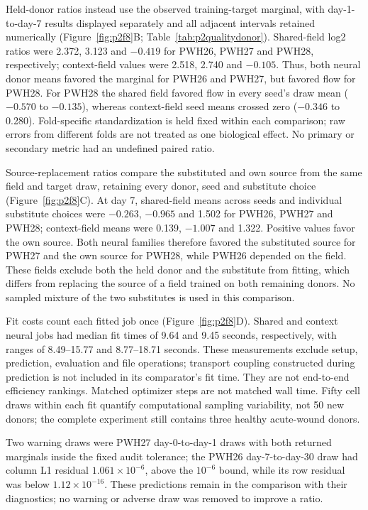 \documentclass[10pt,a4paper]{article}
\begin{document}
Held-donor ratios instead use the observed training-target marginal, with day-1-to-day-7 results displayed separately and all adjacent intervals retained numerically (Figure~\ref{fig:p2f8}B; Table~\ref{tab:p2qualitydonor}). Shared-field log2 ratios were 2.372, 3.123 and $-0.419$ for PWH26, PWH27 and PWH28, respectively; context-field values were 2.518, 2.740 and $-0.105$. Thus, both neural donor means favored the marginal for PWH26 and PWH27, but favored flow for PWH28. For PWH28 the shared field favored flow in every seed's draw mean ($-0.570$ to $-0.135$), whereas context-field seed means crossed zero ($-0.346$ to 0.280). Fold-specific standardization is held fixed within each comparison; raw errors from different folds are not treated as one biological effect. No primary or secondary metric had an undefined paired ratio.




Source-replacement ratios compare the substituted and own source from the same field and target draw, retaining every donor, seed and substitute choice (Figure~\ref{fig:p2f8}C). At day 7, shared-field means across seeds and individual substitute choices were $-0.263$, $-0.965$ and 1.502 for PWH26, PWH27 and PWH28; context-field means were 0.139, $-1.007$ and 1.322. Positive values favor the own source. Both neural families therefore favored the substituted source for PWH27 and the own source for PWH28, while PWH26 depended on the field. These fields exclude both the held donor and the substitute from fitting, which differs from replacing the source of a field trained on both remaining donors. No sampled mixture of the two substitutes is used in this comparison.

Fit costs count each fitted job once (Figure~\ref{fig:p2f8}D). Shared and context neural jobs had median fit times of 9.64 and 9.45 seconds, respectively, with ranges of 8.49--15.77 and 8.77--18.71 seconds. These measurements exclude setup, prediction, evaluation and file operations; transport coupling constructed during prediction is not included in its comparator's fit time. They are not end-to-end efficiency rankings. Matched optimizer steps are not matched wall time. Fifty cell draws within each fit quantify computational sampling variability, not 50 new donors; the complete experiment still contains three healthy acute-wound donors.

Two warning draws were PWH27 day-0-to-day-1 draws with both returned marginals inside the fixed audit tolerance; the PWH26 day-7-to-day-30 draw had column L1 residual $1.061\times10^{-6}$, above the $10^{-6}$ bound, while its row residual was below $1.12\times10^{-16}$. These predictions remain in the comparison with their diagnostics; no warning or adverse draw was removed to improve a ratio.
\end{document}
